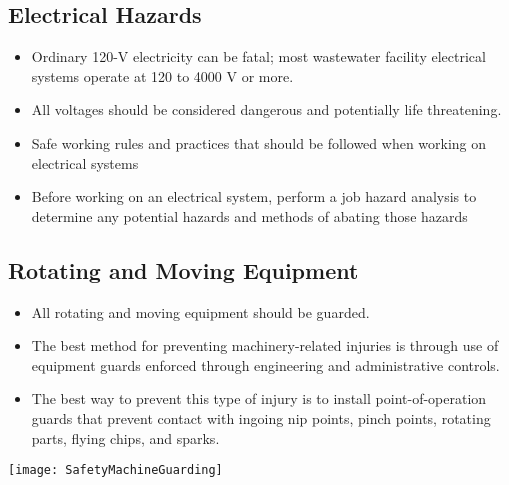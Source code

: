 \subsection{Electrical Hazards}
\begin{itemize}
\item Ordinary 120-V electricity can be fatal; most wastewater facility electrical systems operate at 120 to 4000 V or more.  
\item All voltages should be considered dangerous and potentially life threatening.  
\item Safe working rules and practices that should be followed when working on electrical systems
\item Before working on an electrical system, perform a job hazard analysis to determine any potential hazards and methods of abating those hazards
\end{itemize}


\subsection{Rotating and Moving Equipment}

\begin{itemize}
\item All rotating and moving equipment should be guarded. 
\item The best method for preventing machinery-related injuries is through use of equipment guards enforced through engineering and administrative controls.   
\item The best way to prevent this type of injury is to install point-of-operation guards that prevent contact with ingoing nip points, pinch points, rotating parts, flying chips, and sparks.
\end{itemize}
\begin{center}
\texttt{[image: SafetyMachineGuarding]}\\
\end{center}

